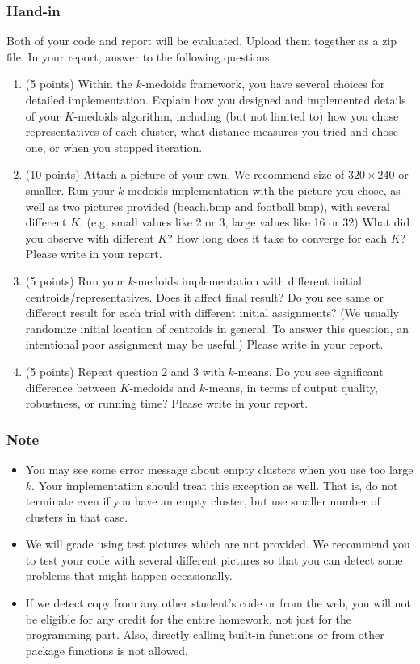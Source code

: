 \documentclass[twoside,10pt]{article}
\begin{document}
\subsubsection*{Hand-in}
Both of your code and report will be evaluated. Upload them together as a zip file. In your report, answer to the following questions:
\begin{enumerate}
  \item (5 points) Within the $k$-medoids framework, you have several choices for detailed implementation. Explain how you designed and implemented details of your $K$-medoids algorithm, including (but not limited to) how you chose representatives of each cluster, what distance measures you tried and chose one, or when you stopped iteration.
  \item (10 points) Attach a picture of your own. We recommend size of $320 \times 240$ or smaller. Run your $k$-medoids implementation with the picture you chose, as well as two pictures provided (\textsf{beach.bmp} and \textsf{football.bmp}), with several different $K$. (e.g, small values like 2 or 3, large values like 16 or 32) What did you observe with different $K$? How long does it take to converge for each $K$? Please write in your report. 
  \item (5 points) Run your $k$-medoids implementation with different initial centroids/representatives. Does it affect final result? Do you see same or different result for each trial with different initial assignments? (We usually randomize initial location of centroids in general. To answer this question, an intentional poor assignment may be useful.) Please write in your report. 
  \item (5 points) Repeat question 2 and 3 with $k$-means. Do you see significant difference between $K$-medoids and $k$-means, in terms of output quality, robustness, or running time? Please write in your report. 
\end{enumerate}


\subsubsection*{Note}
\begin{itemize}
  \item You may see some error message about empty clusters when you use too large $k$. Your implementation should treat this exception as well. That is, do not terminate even if you have an empty cluster, but use smaller number of clusters in that case.

  \item We will grade using test pictures which are not provided. We recommend you to test your code with several different pictures so that you can detect some problems that might happen occasionally. 

  \item If we detect copy from any other student's code or from the web, you will not be eligible for any credit for the entire homework, not just for the programming part. Also, directly calling built-in functions or from other package functions is not allowed.
\end{itemize}
\end{document}
